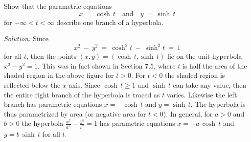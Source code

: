 \begin{exmp}\label{exmp:paramhyperbola}
\noindent Show that the parametric equations
\[
x ~=~ \cosh\,t \quad\text{and}\quad y ~=~ \sinh\,t
\]
for $-\infty < t < \infty$ describe one branch of a hyperbola.\vspace{1mm}
\par\noindent\emph{Solution:} Since
\[
x^2 ~-~ y^2 ~=~ \cosh^2 t ~-~ \sinh^2 t ~=~ 1
\]
for all $t$, then the points $(x,y) = (\cosh\,t,\sinh\,t)$ lie on the unit
hyperbola $x^2-y^2=1$. This was in fact shown in Section 7.5, where $t$ is half
the area of the shaded region in the above figure for $t>0$. For $t<0$ the
shaded region is reflected below the $x$-axis. Since $\cosh\,t \ge 1$ and
$\sinh\,t$ can take any value, then the entire right branch of the hyperbola is
traced as $t$ varies. Likewise the left branch has parametric equations
$x=-\cosh\,t$ and $y=\sinh\,t$. The hyperbola is thus parametrized by area (or
negative area for $t <0$). In general, for $a>0$ and $b>0$ the hyperbola
$\frac{x^2}{a^2}-\frac{y^2}{b^2}=1$ has parametric equations
$x=\pm a\,\cosh\,t$ and $y=b\,\sinh\,t$ for all $t$.
\end{exmp}
\divider
\newpage
